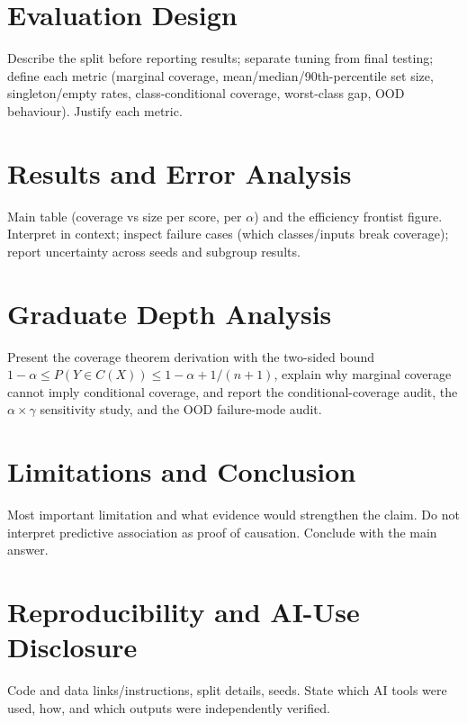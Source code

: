 \documentclass{article}
\begin{document}
\section{Evaluation Design}
Describe the split before reporting results; separate tuning from final testing; define each metric
(marginal coverage, mean/median/90th-percentile set size, singleton/empty rates, class-conditional
coverage, worst-class gap, OOD behaviour). Justify each metric.

\section{Results and Error Analysis}
Main table (coverage vs size per score, per $\alpha$) and the efficiency frontist figure. Interpret
in context; inspect failure cases (which classes/inputs break coverage); report uncertainty across
seeds and subgroup results.

\section{Graduate Depth Analysis}
Present the coverage theorem derivation with the two-sided bound
$1-\alpha \le P(Y \in C(X)) \le 1-\alpha + 1/(n+1)$, explain why marginal coverage cannot imply
conditional coverage, and report the conditional-coverage audit, the $\alpha \times \gamma$
sensitivity study, and the OOD failure-mode audit.

\section{Limitations and Conclusion}
Most important limitation and what evidence would strengthen the claim. Do not interpret predictive
association as proof of causation. Conclude with the main answer.

\section{Reproducibility and AI-Use Disclosure}
Code and data links/instructions, split details, seeds. State which AI tools were used, how, and
which outputs were independently verified.



\end{document}
